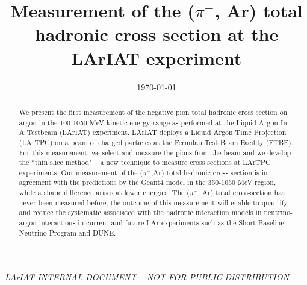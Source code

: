 \documentclass[aps,prl,twocolumn,showpacs,superscriptaddress,groupedaddress]{revtex4}  %
\begin{document}
\widetext
{}
\centerline{\em LArIAT INTERNAL DOCUMENT -- NOT FOR PUBLIC DISTRIBUTION}


\title{Measurement of the ($\pi^-$, Ar) total hadronic cross section at the LArIAT experiment}
\date{\today}


\begin{abstract}
We present the first measurement of the negative pion total hadronic cross section on argon in the 100-1050 MeV kinetic energy range as performed at the Liquid Argon In A Testbeam (LArIAT)  experiment. LArIAT deploys a Liquid Argon Time Projection (LArTPC) on a beam of charged particles at the Fermilab Test Beam Facility (FTBF). 
For this measurement, we select and measure the pions from the beam and we develop the ``thin slice method" --  a new technique to measure cross sections at LArTPC experiments.  Our measurement of the  ($\pi^-$,Ar) total hadronic cross section is in agreement with the predictions by the Geant4  model in the 350-1050 MeV region, while a shape difference arises at lower energies.
The ($\pi^-$, Ar) total cross-section has never been measured before; the outcome of this measurement will enable to quantify and reduce the systematic associated with the hadronic interaction models in neutrino-argon interactions in current and future LAr experiments such as the Short Baseline Neutrino Program and DUNE.\\

 \end{abstract}

\maketitle
\end{document}

